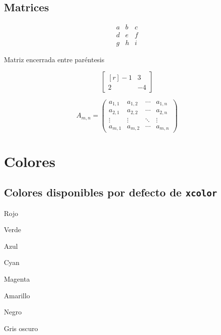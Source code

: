 \documentclass{article}
\begin{document}
\subsection{Matrices}

\begin{equation*}
  \begin{matrix}
    a & b & c \\
    d & e & f \\
    g & h & i
  \end{matrix}
\end{equation*}

Matriz encerrada entre paréntesis

\begin{equation*}
  \begin{bmatrix*}[r]
    -1 & 3  \\
    2  & -4
  \end{bmatrix*}
\end{equation*}

\begin{equation*}
  A_{m,n} = 
    \begin{pmatrix}
      a_{1,1} & a_{1,2} & \cdots & a_{1,n} \\
      a_{2,1} & a_{2,2} & \cdots & a_{2,n} \\
      \vdots  & \vdots  & \ddots & \vdots  \\
      a_{m,1} & a_{m,2} & \cdots & a_{m,n}
    \end{pmatrix}
\end{equation*}

\section{Colores}

\subsection{Colores disponibles por defecto de \texttt{xcolor}}

{\color{red} Rojo}

{\color{green} Verde}

{\color{blue} Azul}

{\color{cyan} Cyan}

{\color{magenta} Magenta}

{\color{yellow} Amarillo}

{\color{black} Negro}

{\color{darkgray} Gris oscuro}
\end{document}
